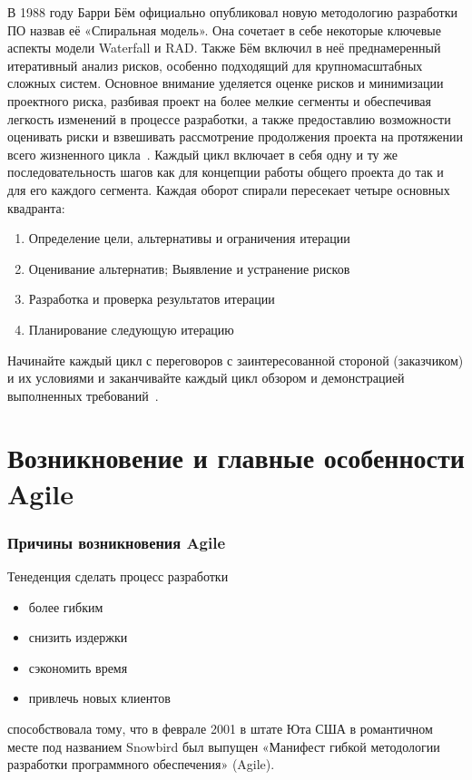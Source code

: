 \documentclass{../industrial-development}
\begin{document}
\lecturenotes
В 1988 году Барри Бём официально опубликовал новую методологию разработки ПО назвав её «Спиральная модель». Она сочетает в себе некоторые ключевые аспекты модели Waterfall и RAD. Также Бём включил в неё преднамеренный итеративный анализ рисков, особенно подходящий для крупномасштабных сложных систем.
Основное внимание уделяется оценке рисков и минимизации проектного риска, разбивая проект на более мелкие сегменты и обеспечивая легкость изменений в процессе разработки, а также предоставлию возможности оценивать риски и взвешивать рассмотрение продолжения проекта на протяжении всего жизненного цикла~\cite{MethodolyComparison}.
Каждый цикл включает в себя одну и ту же последовательность шагов как для концепции работы общего проекта до так и для его каждого сегмента. Каждая оборот спирали пересекает четыре основных квадранта: 
\begin{enumerate}
	\item Определение цели, альтернативы и ограничения итерации
	\item Оценивание альтернатив; Выявление и устранение рисков
	\item Разработка и проверка результатов итерации
	\item Планирование следующую итерацию
\end{enumerate}
Начинайте каждый цикл с переговоров с заинтересованной стороной (заказчиком) и их условиями и заканчивайте каждый цикл обзором и демонстрацией выполненных требований~\cite{Boehm}. 


\section{Возникновение и главные особенности Agile}

\begin{frame} \frametitle{Причины возникновения Agile}
Тенеденция сделать процесс разработки 
 \begin{itemize}
  \item более гибким
	\item снизить издержки
	\item сэкономить время
	\item привлечь новых клиентов 
	\end{itemize}
\begin{block}{}
способствовала тому, что в феврале 2001 в штате Юта США в романтичном месте под названием Snowbird был выпущен «Манифест гибкой методологии разработки программного обеспечения» (Agile). 
\end {block}
\end {frame}
\end{document}
